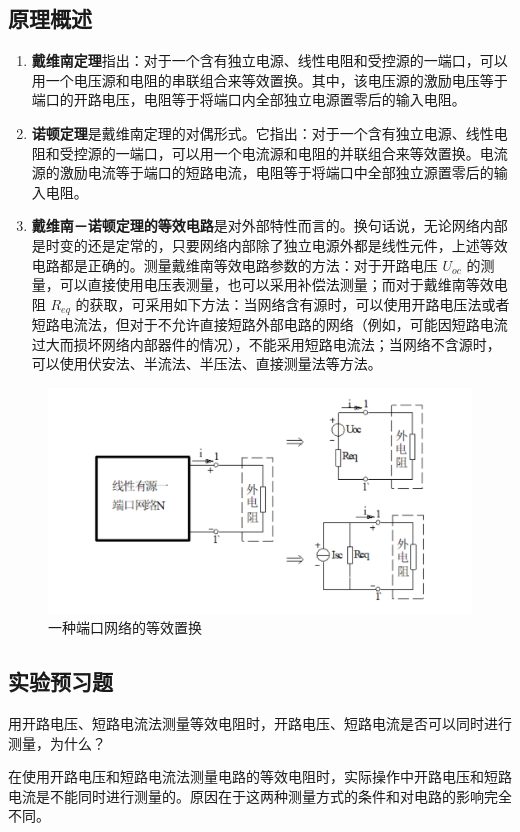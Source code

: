 \documentclass[dvipsnames, svgnames,a4paper,11pt]{article}
\begin{document}
	\subsection{原理概述}
	\begin{enumerate}
	\item \textbf{戴维南定理}指出：对于一个含有独立电源、线性电阻和受控源的一端口，可以用一个电压源和电阻的串联组合来等效置换。其中，该电压源的激励电压等于端口的开路电压，电阻等于将端口内全部独立电源置零后的输入电阻。
	\item \textbf{诺顿定理}是戴维南定理的对偶形式。它指出：对于一个含有独立电源、线性电阻和受控源的一端口，可以用一个电流源和电阻的并联组合来等效置换。电流源的激励电流等于端口的短路电流，电阻等于将端口中全部独立源置零后的输入电阻。
	\item \textbf{戴维南－诺顿定理的等效电路}是对外部特性而言的。换句话说，无论网络内部是时变的还是定常的，只要网络内部除了独立电源外都是线性元件，上述等效电路都是正确的。测量戴维南等效电路参数的方法：对于开路电压 $U_{oc}$ 的测量，可以直接使用电压表测量，也可以采用补偿法测量；而对于戴维南等效电阻 $R_{eq}$ 的获取，可采用如下方法：当网络含有源时，可以使用开路电压法或者短路电流法，但对于不允许直接短路外部电路的网络（例如，可能因短路电流过大而损坏网络内部器件的情况），不能采用短路电流法；当网络不含源时，可以使用伏安法、半流法、半压法、直接测量法等方法。
\end{enumerate}
\begin{figure}[H]
	\centering
	\includegraphics[width=0.4\linewidth]{images/一种端口}
	\caption{一种端口网络的等效置换}
	\label{fig:}
\end{figure}
	
	
	
	\subsection{实验预习题}
	
\begin{question}
	用开路电压、短路电流法测量等效电阻时，开路电压、短路电流是否可以同时进行测量，为什么？
\end{question}

在使用开路电压和短路电流法测量电路的等效电阻时，实际操作中开路电压和短路电流是不能同时进行测量的。原因在于这两种测量方式的条件和对电路的影响完全不同。
\end{document}
